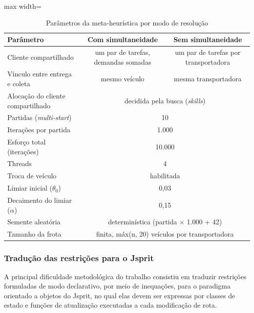 \documentclass[a4paper,12pt]{article}
\begin{document}
\begin{table}[H]
    \centering
    \caption{Parâmetros da meta-heurística por modo de resolução}
    \label{tab:1}
    \vspace{0.2cm}
    \footnotesize
    \setlength{\tabcolsep}{4pt}
    \begin{adjustbox}{max width=\textwidth}
    \begin{tabular}{>{\raggedright\arraybackslash}p{4.6cm} c c}
        \toprule
        \textbf{Parâmetro} & \textbf{Com simultaneidade} & \textbf{Sem simultaneidade} \\
        \midrule
        Cliente compartilhado & um par de tarefas, demandas somadas & um par de tarefas por transportadora \\
        Vínculo entre entrega e coleta & mesmo veículo & mesma transportadora \\
        Alocação do cliente compartilhado & \multicolumn{2}{c}{decidida pela busca (\textit{skills})} \\
        Partidas (\textit{multi-start}) & \multicolumn{2}{c}{10} \\
        Iterações por partida & \multicolumn{2}{c}{1.000} \\
        Esforço total (iterações) & \multicolumn{2}{c}{10.000} \\
        Threads & \multicolumn{2}{c}{4} \\
        Troca de veículo & \multicolumn{2}{c}{habilitada} \\
        Limiar inicial ($\theta_0$) & \multicolumn{2}{c}{0,03} \\
        Decaimento do limiar ($\alpha$) & \multicolumn{2}{c}{0,15} \\
        Semente aleatória & \multicolumn{2}{c}{determinística (partida $\times$ 1.000 + 42)} \\
        Tamanho da frota & \multicolumn{2}{c}{finita, máx(n, 20) veículos por transportadora} \\
        \bottomrule
    \end{tabular}
    \end{adjustbox}
\end{table}

\subsubsection{Tradução das restrições para o Jsprit}
A principal dificuldade metodológica do trabalho consistiu em traduzir restrições formuladas de modo declarativo, por meio de inequações, para o paradigma orientado a objetos do Jsprit, no qual elas devem ser expressas por classes de estado e funções de atualização executadas a cada modificação de rota.
\end{document}
